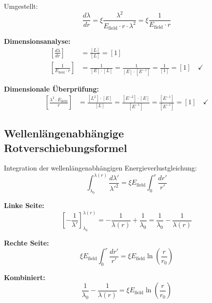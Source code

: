 \documentclass[12pt,a4paper]{report}
\begin{document}
Umgestellt:
\begin{equation}
	\frac{d\lambda}{dr} = \xi \frac{\lambda^2}{E_{\text{field}} \cdot r \cdot \lambda^2} = \xi \frac{1}{E_{\text{field}} \cdot r}
\end{equation}

\textbf{Dimensionsanalyse:}
\begin{align}
	\left[\frac{d\lambda}{dr}\right] &= \frac{[L]}{[L]} = [1] \\
	\left[\frac{1}{E_{\text{field}} \cdot r}\right] &= \frac{1}{[E] \cdot [L]} = \frac{1}{[E] \cdot [E^{-1}]} = \frac{1}{[1]} = [1] \quad \checkmark
\end{align}
	
	\textbf{Dimensionale Überprüfung:}
	\begin{align}
		\left[\frac{\lambda^2 \cdot E_{\text{field}}}{r}\right] &= \frac{[L^2] \cdot [E]}{[L]} = \frac{[E^{-2}] \cdot [E]}{[E^{-1}]} = \frac{[E^{-1}]}{[E^{-1}]} = [1] \quad \checkmark
	\end{align}
	
	\subsection{Wellenlängenabhängige Rotverschiebungsformel}
	\label{subsec:wavelength_dependent_redshift_formula}
	
	Integration der wellenlängenabhängigen Energieverlustgleichung:
	\begin{equation}
		\int_{\lambda_0}^{\lambda(r)} \frac{d\lambda'}{\lambda'^2} = \xi E_{\text{field}} \int_0^r \frac{dr'}{r'}
	\end{equation}
	
	\textbf{Linke Seite:}
	\begin{equation}
		\left[-\frac{1}{\lambda'}\right]_{\lambda_0}^{\lambda(r)} = -\frac{1}{\lambda(r)} + \frac{1}{\lambda_0} = \frac{1}{\lambda_0} - \frac{1}{\lambda(r)}
	\end{equation}
	
	\textbf{Rechte Seite:}
	\begin{equation}
		\xi E_{\text{field}} \int_0^r \frac{dr'}{r'} = \xi E_{\text{field}} \ln\left(\frac{r}{r_0}\right)
	\end{equation}
	
	\textbf{Kombiniert:}
	\begin{equation}
		\frac{1}{\lambda_0} - \frac{1}{\lambda(r)} = \xi E_{\text{field}} \ln\left(\frac{r}{r_0}\right)
	\end{equation}
	
\end{document}
